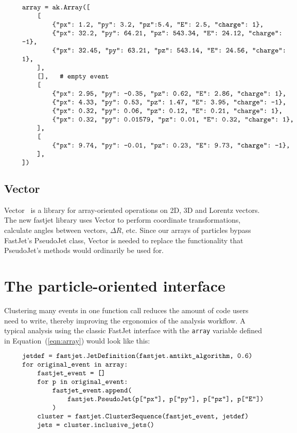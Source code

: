 \documentclass[a4paper]{jpconf}
\begin{document}
\vspace{-0.4 cm}\begin{equation}\label{eqn:array}
\begin{minipage}{0.9\linewidth}
\begin{verbatim}
array = ak.Array([
    [
        {"px": 1.2, "py": 3.2, "pz":5.4, "E": 2.5, "charge": 1},
        {"px": 32.2, "py": 64.21, "pz": 543.34, "E": 24.12, "charge": -1},
        {"px": 32.45, "py": 63.21, "pz": 543.14, "E": 24.56, "charge": 1},
    ],
    [],   # empty event
    [
        {"px": 2.95, "py": -0.35, "pz": 0.62, "E": 2.86, "charge": 1},
        {"px": 4.33, "py": 0.53, "pz": 1.47, "E": 3.95, "charge": -1},
        {"px": 0.32, "py": 0.06, "pz": 0.12, "E": 0.21, "charge": 1},
        {"px": 0.32, "py": 0.01579, "pz": 0.01, "E": 0.32, "charge": 1},
    ],
    [
        {"px": 9.74, "py": -0.01, "pz": 0.23, "E": 9.73, "charge": -1},
    ],
])
\end{verbatim}
\end{minipage}
\end{equation} 

\subsection{Vector}

Vector~\cite{henry_schreiner_2022_5942083} is a library for array-oriented operations on 2D, 3D and Lorentz vectors. The new fastjet library uses Vector to perform coordinate transformations, calculate angles between vectors, $\Delta R$, etc. Since our arrays of particles bypass FastJet's PseudoJet class, Vector is needed to replace the functionality that PseudoJet's methods would ordinarily be used for.

\section{The particle-oriented interface} 

 Clustering many events in one function call reduces the amount of code users need to write, thereby improving the ergonomics of the analysis workflow. A typical analysis using the classic FastJet interface with the \texttt{array} variable defined in Equation~(\ref{eqn:array}) would look like this:
 
\vspace{-0.4 cm}\begin{equation}\label{eqn:classic}
\begin{minipage}{0.9\linewidth}
\begin{verbatim}
jetdef = fastjet.JetDefinition(fastjet.antikt_algorithm, 0.6)
for original_event in array:
    fastjet_event = []
    for p in original_event:
        fastjet_event.append(
            fastjet.PseudoJet(p["px"], p["py"], p["pz"], p["E"])
        )
    cluster = fastjet.ClusterSequence(fastjet_event, jetdef)
    jets = cluster.inclusive_jets()
\end{verbatim}
\end{minipage}
\end{equation}
\end{document}
